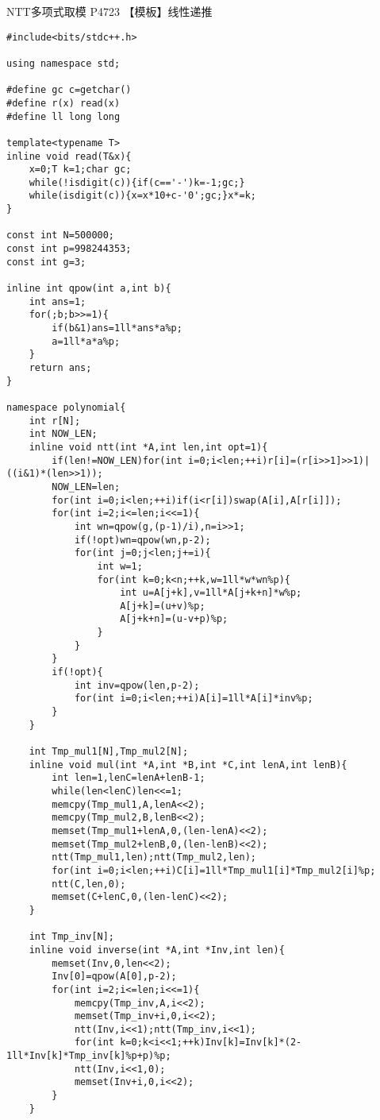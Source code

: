 \documentclass{ctexart}
\begin{document}
NTT多项式取模
P4723 【模板】线性递推
\begin{lstlisting}
#include<bits/stdc++.h>

using namespace std;

#define gc c=getchar()
#define r(x) read(x)
#define ll long long

template<typename T>
inline void read(T&x){
    x=0;T k=1;char gc;
    while(!isdigit(c)){if(c=='-')k=-1;gc;}
    while(isdigit(c)){x=x*10+c-'0';gc;}x*=k;
}

const int N=500000;
const int p=998244353;
const int g=3;

inline int qpow(int a,int b){
    int ans=1;
    for(;b;b>>=1){
        if(b&1)ans=1ll*ans*a%p;
        a=1ll*a*a%p;
    }
    return ans;
}

namespace polynomial{
    int r[N];
    int NOW_LEN;
    inline void ntt(int *A,int len,int opt=1){
        if(len!=NOW_LEN)for(int i=0;i<len;++i)r[i]=(r[i>>1]>>1)|((i&1)*(len>>1));
        NOW_LEN=len;
        for(int i=0;i<len;++i)if(i<r[i])swap(A[i],A[r[i]]);
        for(int i=2;i<=len;i<<=1){
            int wn=qpow(g,(p-1)/i),n=i>>1;
            if(!opt)wn=qpow(wn,p-2);
            for(int j=0;j<len;j+=i){
                int w=1;
                for(int k=0;k<n;++k,w=1ll*w*wn%p){
                    int u=A[j+k],v=1ll*A[j+k+n]*w%p;
                    A[j+k]=(u+v)%p;
                    A[j+k+n]=(u-v+p)%p;
                }
            }
        }
        if(!opt){
            int inv=qpow(len,p-2);
            for(int i=0;i<len;++i)A[i]=1ll*A[i]*inv%p;
        }
    }
    
    int Tmp_mul1[N],Tmp_mul2[N];
    inline void mul(int *A,int *B,int *C,int lenA,int lenB){
        int len=1,lenC=lenA+lenB-1;
        while(len<lenC)len<<=1;
        memcpy(Tmp_mul1,A,lenA<<2);
        memcpy(Tmp_mul2,B,lenB<<2);
        memset(Tmp_mul1+lenA,0,(len-lenA)<<2);
        memset(Tmp_mul2+lenB,0,(len-lenB)<<2);
        ntt(Tmp_mul1,len);ntt(Tmp_mul2,len);
        for(int i=0;i<len;++i)C[i]=1ll*Tmp_mul1[i]*Tmp_mul2[i]%p;
        ntt(C,len,0);
        memset(C+lenC,0,(len-lenC)<<2);
    }
    
    int Tmp_inv[N];
    inline void inverse(int *A,int *Inv,int len){
        memset(Inv,0,len<<2);
        Inv[0]=qpow(A[0],p-2);
        for(int i=2;i<=len;i<<=1){
            memcpy(Tmp_inv,A,i<<2);
            memset(Tmp_inv+i,0,i<<2);
            ntt(Inv,i<<1);ntt(Tmp_inv,i<<1);
            for(int k=0;k<i<<1;++k)Inv[k]=Inv[k]*(2-1ll*Inv[k]*Tmp_inv[k]%p+p)%p;
            ntt(Inv,i<<1,0);
            memset(Inv+i,0,i<<2);
        }
    }
    

\end{lstlisting}
\end{document}
